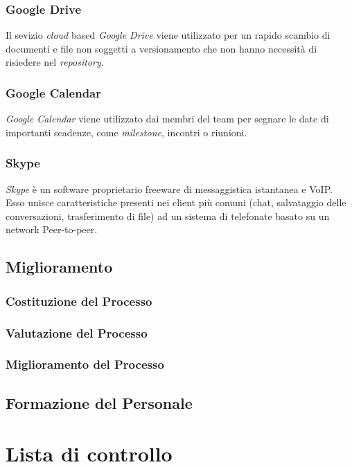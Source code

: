 \subsubsection{Google Drive}
Il sevizio \emph{cloud} based \emph{Google Drive} viene utilizzato
per un rapido scambio di documenti e file non soggetti a versionamento
che non hanno necessità di risiedere nel \emph{repository}.

\subsubsection{Google Calendar}
\emph{Google Calendar} viene utilizzato dai membri del team per
segnare le date di importanti scadenze, come \emph{milestone},
incontri o riunioni. 

\subsubsection{Skype}
\emph{Skype} è un software proprietario freeware di messaggistica
istantanea e VoIP. Esso unisce caratteristiche presenti nei client più
comuni (chat, salvataggio delle conversazioni, trasferimento di file)
ad un sistema di telefonate basato su un network Peer-to-peer. 

\subsection{Miglioramento} %
\subsubsection{Costituzione del Processo}
\subsubsection{Valutazione del Processo}
\subsubsection{Miglioramento del Processo}


\subsection{Formazione del Personale}  %

\clearpage

\appendix



\section{Lista di controllo}




